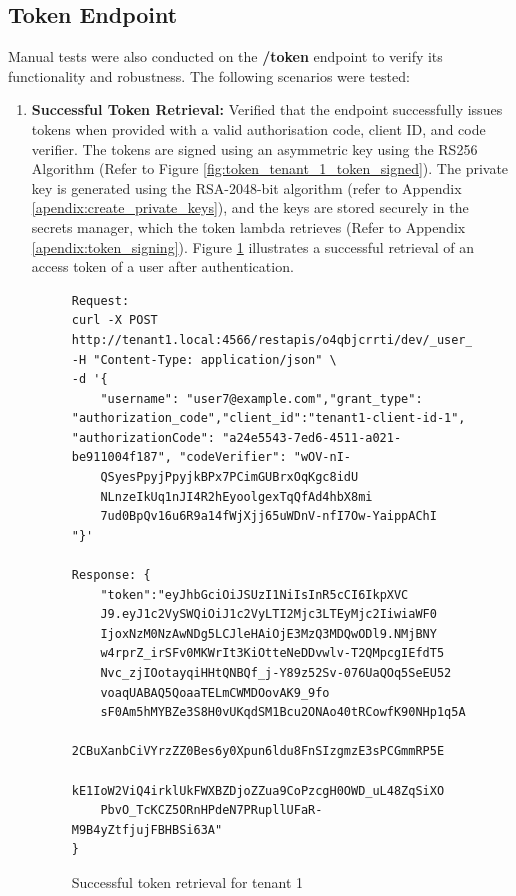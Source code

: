 \newpage
\subsection{Token Endpoint}
Manual tests were also conducted on the \textbf{/token} endpoint to verify its functionality and robustness. The following scenarios were tested:

\begin{enumerate}
    \item \textbf{Successful Token Retrieval:} Verified that the endpoint successfully issues tokens when provided with a valid authorisation code, client ID, and code verifier. The tokens are signed using an asymmetric key using the RS256 Algorithm (Refer to Figure \ref{fig:token_tenant_1_token_signed}). The private key is generated using the RSA-2048-bit algorithm (refer to Appendix \ref{apendix:create_private_keys}), and the keys are stored securely in the secrets manager, which the token lambda retrieves (Refer to Appendix \ref{apendix:token_signing}). Figure \ref{fig:token_tenant_1_success} illustrates a successful retrieval of an access token of a user after authentication.


        \begin{figure}[!htbp]
    \centering
    \begin{lstlisting}[style=curlstyle]
Request:
curl -X POST http://tenant1.local:4566/restapis/o4qbjcrrti/dev/_user_request_/token\                                      
-H "Content-Type: application/json" \
-d '{
    "username": "user7@example.com","grant_type": "authorization_code","client_id":"tenant1-client-id-1", "authorizationCode": "a24e5543-7ed6-4511-a021-be911004f187", "codeVerifier": "wOV-nI-            
    QSyesPpyjPpyjkBPx7PCimGUBrxOqKgc8idU
    NLnzeIkUq1nJI4R2hEyoolgexTqQfAd4hbX8mi
    7ud0BpQv16u6R9a14fWjXjj65uWDnV-nfI7Ow-YaippAChI
"}'

Response: {
    "token":"eyJhbGciOiJSUzI1NiIsInR5cCI6IkpXVC
    J9.eyJ1c2VySWQiOiJ1c2VyLTI2Mjc3LTEyMjc2IiwiaWF0
    IjoxNzM0NzAwNDg5LCJleHAiOjE3MzQ3MDQwODl9.NMjBNY
    w4rprZ_irSFv0MKWrIt3KiOtteNeDDvwlv-T2QMpcgIEfdT5
    Nvc_zjIOotayqiHHtQNBQf_j-Y89z52Sv-076UaQOq5SeEU52
    voaqUABAQ5QoaaTELmCWMDOovAK9_9fo
    sF0Am5hMYBZe3S8H0vUKqdSM1Bcu2ONAo40tRCowfK90NHp1q5A
    2CBuXanbCiVYrzZZ0Bes6y0Xpun6ldu8FnSIzgmzE3sPCGmmRP5E
    kE1IoW2ViQ4irklUkFWXBZDjoZZua9CoPzcgH0OWD_uL48ZqSiXO
    PbvO_TcKCZ5ORnHPdeN7PRupllUFaR-M9B4yZtfjujFBHBSi63A"
}
    \end{lstlisting}
    \caption{Successful token retrieval for tenant 1}
    \label{fig:token_tenant_1_success}
\end{figure}


\end{enumerate}
